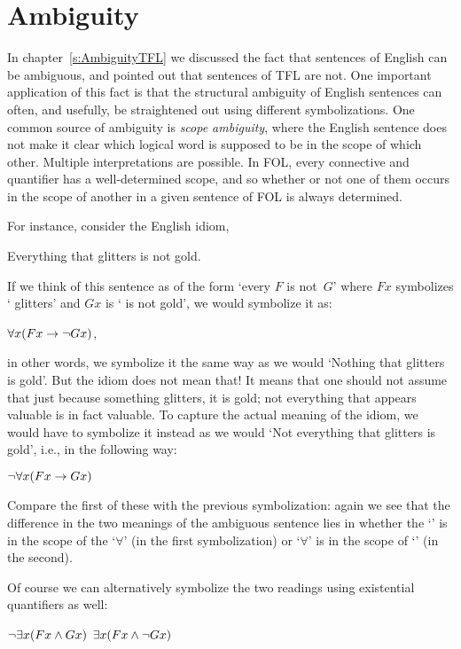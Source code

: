 \chapter{Ambiguity}

In chapter~\ref{s:AmbiguityTFL} we discussed the fact that sentences of English can be ambiguous, and pointed out that sentences of TFL are not. One important application of this fact is that the structural ambiguity of English sentences can often, and usefully, be straightened out using different symbolizations.  One common source of ambiguity is \emph{scope ambiguity}, where the English sentence does not make it clear which logical word is supposed to be in the scope of which other. Multiple interpretations are possible.  In FOL, every connective and quantifier has a well-determined scope, and so whether or not one of them occurs in the scope of another in a given sentence of FOL is always determined.

For instance, consider the English idiom,
\begin{earg}
	\item[\ex{glitters}]
	Everything that glitters is not gold.
\end{earg}
If we think of this sentence as of the form `every $F$ is not~$G$' where $F{x}$ symbolizes ` glitters' and ${G}{x}$ is ` is not gold', we would symbolize it as:
\begin{earg}
	\prem $\forall x(F{x} \rightarrow \neg {G}{x})$,
\end{earg}
in other words, we symbolize it the same way as we would `Nothing that glitters is gold'. But the idiom does not mean that! It means that one should not assume that just because something glitters, it is gold; not everything that appears valuable is in fact valuable.  To capture the actual meaning of the idiom, we would have to symbolize it instead as we would `Not everything that glitters is gold', i.e., in the following way:
\begin{earg}
	\prem $\neg\forall x(F{x} \rightarrow {G}{x})$
\end{earg}
Compare the first of these with the previous symbolization: again we see that the difference in the two meanings of the ambiguous sentence lies in whether the `\enot' is in the scope of the `$\forall$' (in the first symbolization) or `$\forall$' is in the scope of `\enot' (in the second).

Of course we can alternatively symbolize the two readings using existential quantifiers as well:
\begin{earg}
	\prem $\neg\exists x(F{x} \mathbin{\wedge} {G}{x})$
	\prem $\exists x(F{x} \mathbin{\wedge} \neg {G}{x})$
\end{earg}

